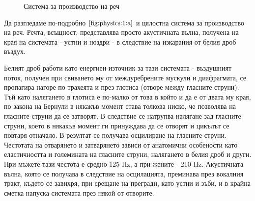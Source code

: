 \documentclass[12pt]{report}
\numberwithin{equation}{section}
\numberwithin{figure}{section}
\begin{document}
\begin{figure}[ht]
\begin{changemargin}{0cm}{0cm}
{                %
            }
        \end{changemargin} 

        \caption{Система за производство на реч}%
        \label{fig:physics:1}
    \end{figure}
    
    Да разгледаме по-подробно $\autoref{fig:physics:1:a}$ и цялостна система за производство на реч.
    Речта, всъщност, представлява просто акустичната вълна, получена на края на системата - устни и ноздри - в следствие на изкарания от белия дроб въздух.

    Белият дроб работи като енергиен източник за тази системата - въздушният поток, получен при свиването му от междуребрените мускули и диафрагмата,
    се пропагира нагоре по трахеята и през глотиса (отворе между гласните струни). Тъй като налягането в глотиса е по-малко от това в който и да е от двата му края, по закона на Бернули
    в някакъв момент става толкова ниско, че позволява на гласните струни да се затворят. В следствие се натрупва налягане зад гласните струни, което в някакъв момент ги принуждава
    да се отворят и цикълът се повтаря отначало. В резултат се получава осцилиране на гласните струни. Честотата на отварянето и затварянето зависи от анатомични особености като еластичността и големината на
    гласните струни, налягането в белия дроб и други. При мъжете тази честота е средно 125 Hz, а при жените - 210 Hz. Акустичната вълна, която се получава в следствие на осцилацията,
    преминава през вокалния тракт, където се завихря, при срещане на прегради, като устни и зъби, и в крайна сметка напуска системата през някой от отворите.
\end{document}
